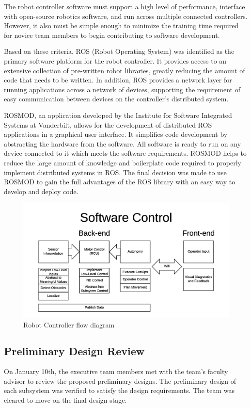 \documentclass[class=article, crop=false]{standalone}
\begin{document}
	The robot controller software must support a high level of performance, interface with open-source robotics software, and run across multiple connected controllers. However, it also must be simple enough to minimize the training time required for novice team members to begin contributing to software development.
	
	Based on these criteria, ROS (Robot Operating System) was identified as the primary software platform for the robot controller. It provides access to an extensive collection of pre-written robot libraries, greatly reducing the amount of code that needs to be written. In addition, ROS provides a network layer for running applications across a network of devices, supporting the requirement of easy communication between devices on the controller’s distributed system. 
	
	ROSMOD, an application developed by the Institute for Software Integrated Systems at Vanderbilt, allows for the development of distributed ROS applications in a graphical user interface. It simplifies code development by abstracting the hardware from the software. All software is ready to run on any device connected to it which meets the software requirements. ROSMOD helps to reduce the large amount of knowledge and boilerplate code required to properly implement distributed systems in ROS. The final decision was made to use ROSMOD to gain the full advantages of the ROS library with an easy way to develop and deploy code.

	\FloatBarrier
	\begin{figure}[h]
	\centering
	 \includegraphics[width=0.8\linewidth]{09_Figures/data-control-high-level.jpg}
	 \caption{Robot Controller flow diagram}
	 \label{fig:data-control}
	\end{figure}
	\FloatBarrier
	
	
	
	\subsection{Preliminary Design Review}
	
	On January 10th, the executive team members met with the team’s faculty advisor to review the proposed preliminary designs. The preliminary design of each subsystem was verified to satisfy the design requirements. The team was cleared to move on the final design stage. 

	
	


	
\end{document}
